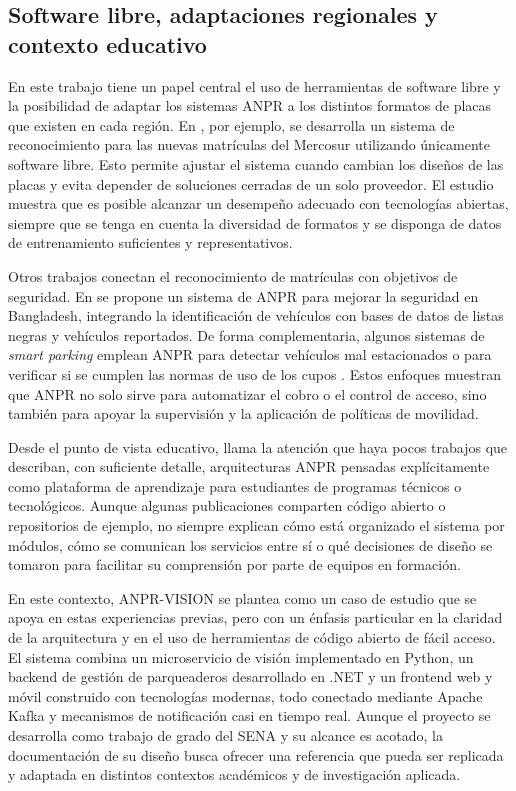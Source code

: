 \subsection{Software libre, adaptaciones regionales y contexto educativo}

En este trabajo tiene un papel central el uso de herramientas de software libre y la posibilidad de adaptar los sistemas ANPR a los distintos formatos de placas que existen en cada región. En \cite{software_libre_mercosur_2016}, por ejemplo, se desarrolla un sistema de reconocimiento para las nuevas matrículas del Mercosur utilizando únicamente software libre. Esto permite ajustar el sistema cuando cambian los diseños de las placas y evita depender de soluciones cerradas de un solo proveedor. El estudio muestra que es posible alcanzar un desempeño adecuado con tecnologías abiertas, siempre que se tenga en cuenta la diversidad de formatos y se disponga de datos de entrenamiento suficientes y representativos.

Otros trabajos conectan el reconocimiento de matrículas con objetivos de seguridad. En \cite{anpr_security_bangladesh_2025} se propone un sistema de ANPR para mejorar la seguridad en Bangladesh, integrando la identificación de vehículos con bases de datos de listas negras y vehículos reportados. De forma complementaria, algunos sistemas de \textit{smart parking} emplean ANPR para detectar vehículos mal estacionados o para verificar si se cumplen las normas de uso de los cupos \cite{smart_parking_wrongly_parked_2023}. Estos enfoques muestran que ANPR no solo sirve para automatizar el cobro o el control de acceso, sino también para apoyar la supervisión y la aplicación de políticas de movilidad.

Desde el punto de vista educativo, llama la atención que haya pocos trabajos que describan, con suficiente detalle, arquitecturas ANPR pensadas explícitamente como plataforma de aprendizaje para estudiantes de programas técnicos o tecnológicos. Aunque algunas publicaciones comparten código abierto o repositorios de ejemplo, no siempre explican cómo está organizado el sistema por módulos, cómo se comunican los servicios entre sí o qué decisiones de diseño se tomaron para facilitar su comprensión por parte de equipos en formación.

En este contexto, ANPR-VISION se plantea como un caso de estudio que se apoya en estas experiencias previas, pero con un énfasis particular en la claridad de la arquitectura y en el uso de herramientas de código abierto de fácil acceso. El sistema combina un microservicio de visión implementado en Python, un backend de gestión de parqueaderos desarrollado en .NET y un frontend web y móvil construido con tecnologías modernas, todo conectado mediante Apache Kafka y mecanismos de notificación casi en tiempo real. Aunque el proyecto se desarrolla como trabajo de grado del SENA y su alcance es acotado, la documentación de su diseño busca ofrecer una referencia que pueda ser replicada y adaptada en distintos contextos académicos y de investigación aplicada.

